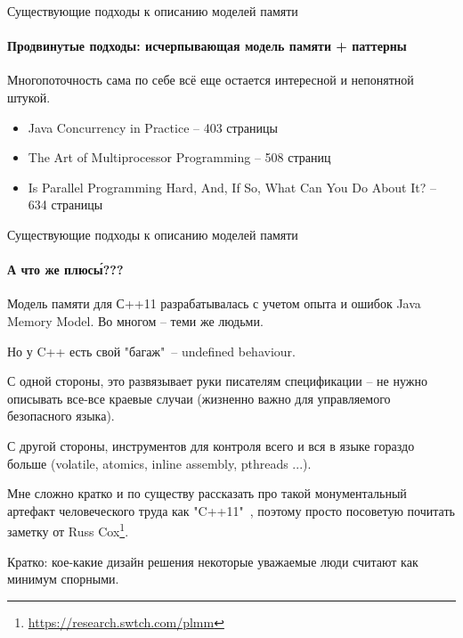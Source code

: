 \begin{frame}{Существующие подходы к описанию моделей памяти}
\framesubtitle{Продвинутые подходы: исчерпывающая модель памяти + паттерны}

Многопоточность сама по себе всё еще остается {\color{red} интересной и непонятной штукой}.
\begin{itemize}
	\item Java Concurrency in Practice -- 403 страницы
	\item The Art of Multiprocessor Programming -- 508 страниц
	\item Is Parallel Programming Hard, And, If So, What Can You Do About It? -- 634 страницы
\end{itemize}

\end{frame}



\begin{frame}{Существующие подходы к описанию моделей памяти}
\framesubtitle{А что же плюс\'{ы}???}

\pause
Модель памяти для С++11 разрабатывалась с учетом опыта и ошибок Java Memory Model. Во многом -- теми же людьми.

\pause
Но у C++ есть свой "багаж"\ -- undefined behaviour.

\pause
С одной стороны, это развязывает руки писателям спецификации -- не нужно описывать все-все краевые случаи (жизненно важно для управляемого безопасного языка).

\pause
С другой стороны, инструментов для контроля всего и вся в языке гораздо больше (volatile, atomics, inline assembly, pthreads ...).   

\pause
Мне сложно кратко и по существу рассказать про такой монументальный артефакт человеческого труда как "C++11"\ , поэтому просто посоветую почитать заметку от
Russ Cox\footnote<6->{\tiny\url{https://research.swtch.com/plmm}}.

\pause
Кратко: кое-какие дизайн решения некоторые уважаемые люди считают как минимум спорными.

\end{frame}


